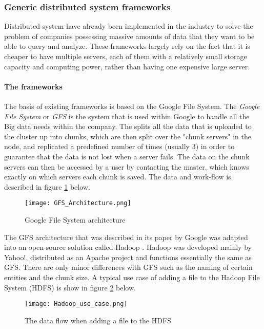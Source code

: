 \subsubsection{Generic distributed system frameworks}
Distributed system have already been implemented in the industry to solve the problem of companies possessing massive amounts of data that they want to be able to query and analyze. These frameworks largely rely on the fact that it is cheaper
to have multiple servers, each of them with a relatively small storage capacity and computing power, rather than having one expensive large server.

\paragraph{The frameworks}
The basis of existing frameworks is based on the Google File System\cite{Ghem03}. The \textit{Google File System} or \textit{GFS} is the system that is used within Google to handle all the Big data needs within the company. The splits all the data that is uploaded to the cluster up into chunks, which are then split over the "chunk servers" in the node, and replicated a predefined number of times (usually 3) in order to guarantee that the data is not lost when a server fails. The
data on the chunk servers can then be accessed by a user by contacting the master, which knows exactly on which servers each chunk is saved.\cite{Ghem03} The data and work-flow is described in figure \ref{GFS_Architecture} below.

\begin{figure}
  \texttt{[image: GFS\_Architecture.png]}
  \caption{Google File System architecture\cite{Ghem03}}
  \label{GFS_Architecture}
\end{figure}

The GFS architecture that was described in its paper by Google was adapted into an open-source solution called Hadoop \cite{Shv10}. Hadoop was developed mainly by Yahoo!, distributed as an Apache project and functions essentially the same as GFS. There are only minor differences with GFS such as the naming of certain entities and the chunk size. A typical use case of adding a file to the Hadoop File System (HDFS) is show in figure \ref{Hadoop_usecase} below.

\begin{figure}
  \texttt{[image: Hadoop\_use\_case.png]}
  \caption{The data flow when adding a file to the HDFS\cite{Shv10}}
  \label{Hadoop_usecase}
\end{figure}

